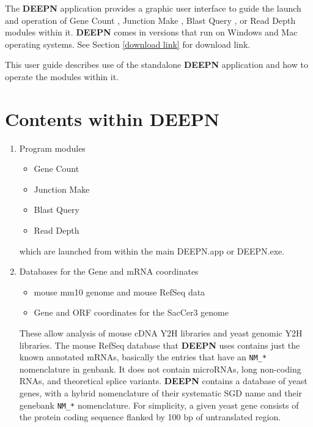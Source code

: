 \documentclass[11pt,fleqn]{book} %
\newcommand{\GeneCount}{{\color{Red} Gene Count }}
\newcommand{\JunctionMake}{{\color{Blue} Junction Make }}
\newcommand{\BlastQuery}{{\color{ForestGreen} Blast Query }}
\newcommand{\ReadDepth}{{\color{Bittersweet} Read Depth }}
\newcommand{\DEEPN}{\textbf{DEEPN }}
\begin{document}
The \DEEPN application provides a graphic user interface to guide the launch and operation of \GeneCount, \JunctionMake, \BlastQuery, or \ReadDepth modules within it. \DEEPN comes in versions that run on Windows and Mac operating systems. See Section \ref{download link} for download link.

This user guide describes use of the standalone \DEEPN application and how to operate the modules within it.


\section{Contents within DEEPN}

\begin{enumerate}
\item Program modules
	\begin{itemize} 
		\item {\color{Red} Gene Count}
		\item {\color{Blue} Junction Make}
		\item {\color{ForestGreen} Blast Query}
		\item {\color{Bittersweet} Read Depth}
	\end{itemize}
which are launched from within the main DEEPN.app or DEEPN.exe.
\item Databases for the Gene and mRNA coordinates
	\begin{itemize} 
		\item mouse mm10 genome and mouse RefSeq data
		\item Gene and ORF coordinates for the SacCer3 genome
	\end{itemize}
These allow analysis of mouse cDNA Y2H libraries and yeast genomic Y2H libraries.  The mouse RefSeq database that \DEEPN uses contains just the known annotated mRNAs, basically the entries that have an \texttt{NM\_*} nomenclature in genbank.  It does not contain microRNAs, long non-coding RNAs, and theoretical splice variants. \DEEPN contains a database of yeast genes, with a hybrid nomenclature of their systematic SGD name and their genebank \texttt{NM\_*} nomenclature.  For simplicity, a given yeast gene consists of the protein coding sequence flanked by 100 bp of untranslated region.
	

\end{enumerate}
\end{document}

